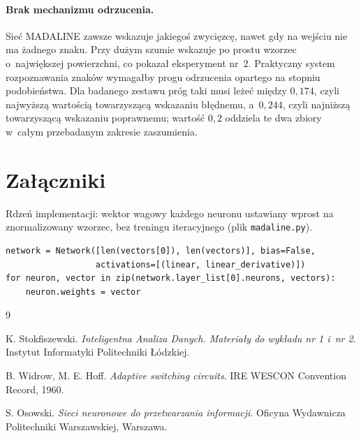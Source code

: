 \documentclass[12pt]{article}
\begin{document}
\paragraph{Brak mechanizmu odrzucenia.} Sieć MADALINE zawsze wskazuje jakiegoś
zwycięzcę, nawet gdy na wejściu nie ma żadnego znaku. Przy dużym szumie wskazuje
po prostu wzorzec o~największej powierzchni, co pokazał eksperyment nr~2. Praktyczny system rozpoznawania znaków wymagałby progu odrzucenia opartego na
stopniu podobieństwa. Dla badanego zestawu próg taki musi leżeć między $0{,}174$,
czyli najwyższą wartością towarzyszącą wskazaniu błędnemu, a~$0{,}244$, czyli
najniższą towarzyszącą wskazaniu poprawnemu; wartość $0{,}2$ oddziela te dwa
zbiory w~całym przebadanym zakresie zaszumienia.

\section{Załączniki}

Rdzeń implementacji: wektor wagowy każdego neuronu ustawiany wprost na
znormalizowany wzorzec, bez treningu iteracyjnego (plik \texttt{madaline.py}).

\begin{verbatim}
network = Network([len(vectors[0]), len(vectors)], bias=False,
                  activations=[(linear, linear_derivative)])
for neuron, vector in zip(network.layer_list[0].neurons, vectors):
    neuron.weights = vector
\end{verbatim}

\begin{thebibliography}{9}

K. Stokfiszewski.
\textit{Inteligentna Analiza Danych. Materiały do wykładu nr 1 i~nr 2}.
Instytut Informatyki Politechniki Łódzkiej.

B. Widrow, M. E. Hoff.
\textit{Adaptive switching circuits}.
IRE WESCON Convention Record, 1960.

S. Osowski.
\textit{Sieci neuronowe do przetwarzania informacji}.
Oficyna Wydawnicza Politechniki Warszawskiej, Warszawa.

\end{thebibliography}
\end{document}
